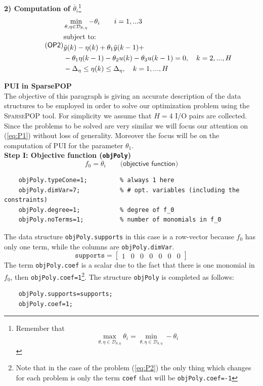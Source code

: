\noindent
\textbf{2) Computation of $\overline{\theta}_i$}\footnote[1]{Remember that 
    $$
        \max_{\theta, \eta  \in \mathcal{D}_{\theta, \eta}} \theta_i = \min_{\theta, \eta  \in \mathcal{D}_{\theta, \eta}} -\theta_i
    $$
}
\begin{equation*}  \label{eq:P2} \tag{\textsf{OP2}}
    \begin{aligned}
        &\min_{\theta, \eta \in \mathcal{D}_{\theta, \eta}} -\theta_i \qquad i=1,...3\\
    & \text{subject to:}  \\
    &  \tilde{y}(k)-\eta(k) + \theta_1 \tilde{y}(k-1)+ \\
    &- \theta_1 \eta(k-1)  - \theta_2 u(k) - \theta_3 u(k-1)=0, \quad k=2,...,H\\
    &-\Delta_\eta \le \eta(k) \le  \Delta_\eta, \quad k=1,...,H
    \end{aligned}
\end{equation*}

\noindent
\textbf{\large\color{red}PUI in SparsePOP}\\
The objective of this paragraph is giving an accurate description of the data structures to be employed in order to solve our optimization problem using the \textsc{SparsePOP} tool. For simplicity we assume that $H=4$ I/O pairs are collected. Since the problems to be solved are very similar we will focus our attention on (\ref{eq:P1}) without loss of generality. Moreover the focus will be on the computation of PUI for the parameter $\theta_1$.\\

\noindent
\textbf{Step I: Objective function (\texttt{objPoly})}
\begin{equation*}
    f_0 = \theta_i  \qquad \textsf{(objective function)}
\end{equation*}
\begin{verbatim}
    objPoly.typeCone=1;         % always 1 here
    objPoly.dimVar=7;           % # opt. variables (including the constraints)
    objPoly.degree=1;           % degree of f_0
    objPoly.noTerms=1;          % number of monomials in f_0
\end{verbatim}
The data structure \texttt{objPoly.supports} in this case is a row-vector because $f_0$ has only one term, while the columns are \texttt{objPoly.dimVar}.
\begin{equation*}
    \texttt{supports} = \begin{bmatrix}
        1&0&0&0&0&0&0
    \end{bmatrix}
\end{equation*}
The term \texttt{objPoly.coef} is a scalar due to the fact that there is one monomial in $f_0$, then \texttt{objPoly.coef=1}\footnote[2]{Note that in the case of the problem (\ref{eq:P2}) the only thing which changes for each problem is only the term \texttt{coef} that will be \texttt{objPoly.coef=-1}}. The structure \texttt{objPoly} is completed as follows:
\begin{verbatim}
    objPoly.supports=supports; 
    objPoly.coef=1;
\end{verbatim}

